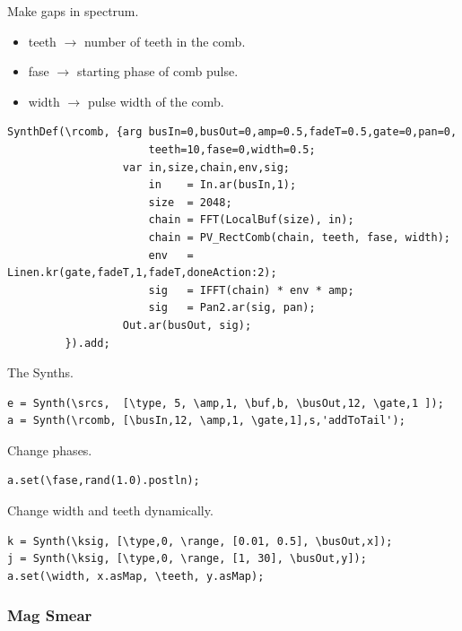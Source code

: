 Make gaps in spectrum.

\begin{itemize}
\tightlist 
\item teeth \(\rightarrow\) number of teeth in the comb. 
\item fase \(\rightarrow\) starting phase of comb pulse. 
\item width \(\rightarrow\) pulse width of the comb.
\end{itemize}

\begin{lstlisting}[frame=single,caption=Rect Comb filter spectral model] 
SynthDef(\rcomb, {arg busIn=0,busOut=0,amp=0.5,fadeT=0.5,gate=0,pan=0,
                      teeth=10,fase=0,width=0.5;
                  var in,size,chain,env,sig;
                      in    = In.ar(busIn,1);
                      size  = 2048;
                      chain = FFT(LocalBuf(size), in);
                      chain = PV_RectComb(chain, teeth, fase, width);
                      env   = Linen.kr(gate,fadeT,1,fadeT,doneAction:2);
                      sig   = IFFT(chain) * env * amp;
                      sig   = Pan2.ar(sig, pan);
                  Out.ar(busOut, sig);
         }).add;
\end{lstlisting}

The Synths.

\begin{lstlisting}[frame=single] 
e = Synth(\srcs,  [\type, 5, \amp,1, \buf,b, \busOut,12, \gate,1 ]);
a = Synth(\rcomb, [\busIn,12, \amp,1, \gate,1],s,'addToTail');
\end{lstlisting}

Change phases.

\begin{lstlisting}[frame=single] 
a.set(\fase,rand(1.0).postln);
\end{lstlisting}

Change width and teeth dynamically.

\begin{lstlisting}[frame=single] 
k = Synth(\ksig, [\type,0, \range, [0.01, 0.5], \busOut,x]);
j = Synth(\ksig, [\type,0, \range, [1, 30], \busOut,y]);
a.set(\width, x.asMap, \teeth, y.asMap);
\end{lstlisting}

\subsubsection{Mag Smear}\label{mag-smear}

